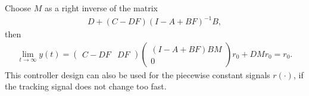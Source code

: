 Choose $M$ as a right inverse of the matrix 
\begin{align}
D + (C - D F) (I - A + B F)^{-1} B,
\end{align}
then \begin{align}
\lim_{t \to \infty} y(t) = 
\begin{pmatrix}
C - DF & DF
\end{pmatrix}
\begin{pmatrix}
(I - A + BF)BM \\ 0
\end{pmatrix}
r_0 + D M r_0 = r_0.
\end{align}
This controller design can also be used for the piecewise constant signals $r(\cdot)$, if the tracking signal does not change too fast. 
